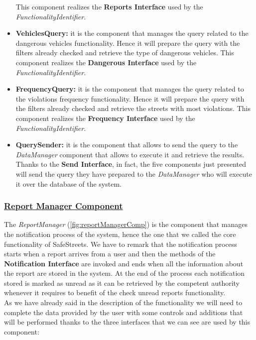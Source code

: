 \begin{itemize}
				This component realizes the \textbf{Reports Interface} used by the \emph{FunctionalityIdentifier}.
				
				\item \textbf{VehiclesQuery:} it is the component that manages the query related to the dangerous vehicles functionality. Hence it will prepare the query with the filters already checked and retrieve the type of dangerous vehicles. This component realizes the \textbf{Dangerous Interface} used by the \emph{FunctionalityIdentifier}.
				
				\item \textbf{FrequencyQuery:} it is the component that manages the query related to the violations frequency functionality. Hence it will prepare the query with the filters already checked and retrieve the streets with most violations. This component realizes the \textbf{Frequency Interface} used by the \emph{FunctionalityIdentifier}.
				
				\item \textbf{QuerySender:} it is the component that allows to send the query to the \emph{DataManager} component that allows to execute it and retrieve the results. Thanks to the \textbf{Send Interface}, in fact, the five components just presented will send the query they have prepared to the \emph{DataManager} who will execute it over the database of the system.
			\end{itemize}
		
		\subsubsection[Report Manager Component]{\hyperlink{toc}{Report Manager Component}}
			\label{sec:reportManagerComponent}
			
			The \emph{ReportManager} (\autoref{fig:reportManagerComp}) is the component that manages the notification process of the system, hence the one that we called the core functionality of SafeStreets. We have to remark that the notification process starts when a report arrives from a user and then the methods of the \textbf{Notification Interface} are invoked and ends when all the information about the report are stored in the system. At the end of the process each notification stored is marked as unread as it can be retrieved by the competent authority whenever it requires to benefit of the check unread reports functionality.\\
			
			As we have already said in the description of the functionality we will need to complete the data provided by the user with some controls and additions that will be performed thanks to the three interfaces that we can see are used by this component:
			

